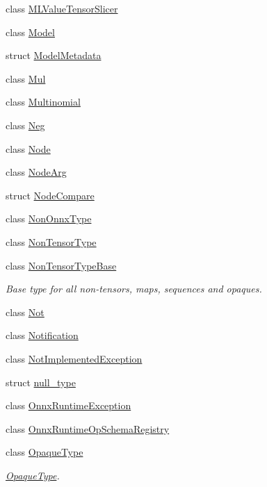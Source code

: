 \begin{DoxyCompactItemize}
\item 
class \mbox{\hyperlink{classonnxruntime_1_1MLValueTensorSlicer}{M\+L\+Value\+Tensor\+Slicer}}
\item 
class \mbox{\hyperlink{classonnxruntime_1_1Model}{Model}}
\item 
struct \mbox{\hyperlink{structonnxruntime_1_1ModelMetadata}{Model\+Metadata}}
\item 
class \mbox{\hyperlink{classonnxruntime_1_1Mul}{Mul}}
\item 
class \mbox{\hyperlink{classonnxruntime_1_1Multinomial}{Multinomial}}
\item 
class \mbox{\hyperlink{classonnxruntime_1_1Neg}{Neg}}
\item 
class \mbox{\hyperlink{classonnxruntime_1_1Node}{Node}}
\item 
class \mbox{\hyperlink{classonnxruntime_1_1NodeArg}{Node\+Arg}}
\item 
struct \mbox{\hyperlink{structonnxruntime_1_1NodeCompare}{Node\+Compare}}
\item 
class \mbox{\hyperlink{classonnxruntime_1_1NonOnnxType}{Non\+Onnx\+Type}}
\item 
class \mbox{\hyperlink{classonnxruntime_1_1NonTensorType}{Non\+Tensor\+Type}}
\item 
class \mbox{\hyperlink{classonnxruntime_1_1NonTensorTypeBase}{Non\+Tensor\+Type\+Base}}
\begin{DoxyCompactList}\small\item\em Base type for all non-\/tensors, maps, sequences and opaques. \end{DoxyCompactList}\item 
class \mbox{\hyperlink{classonnxruntime_1_1Not}{Not}}
\item 
class \mbox{\hyperlink{classonnxruntime_1_1Notification}{Notification}}
\item 
class \mbox{\hyperlink{classonnxruntime_1_1NotImplementedException}{Not\+Implemented\+Exception}}
\item 
struct \mbox{\hyperlink{structonnxruntime_1_1null__type}{null\+\_\+type}}
\item 
class \mbox{\hyperlink{classonnxruntime_1_1OnnxRuntimeException}{Onnx\+Runtime\+Exception}}
\item 
class \mbox{\hyperlink{classonnxruntime_1_1OnnxRuntimeOpSchemaRegistry}{Onnx\+Runtime\+Op\+Schema\+Registry}}
\item 
class \mbox{\hyperlink{classonnxruntime_1_1OpaqueType}{Opaque\+Type}}
\begin{DoxyCompactList}\small\item\em \mbox{\hyperlink{classonnxruntime_1_1OpaqueType}{Opaque\+Type}}. \end{DoxyCompactList}\item 

\end{DoxyCompactItemize}
